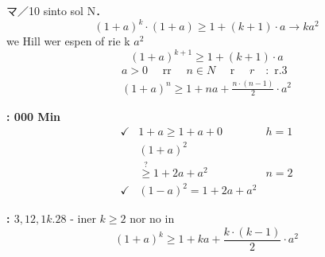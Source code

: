\documentclass[12pt]{article}
\begin{document}
マ／10 sinto sol N．
\[
(1+a)^{k} \cdot(1+a) \geq 1+(k+1) \cdot a \rightarrow k a^{2}
\]
we Hill wer espen of rie k \(a^{2}\)
\[
(1+a)^{k+1} \geq 1+(k+1) \cdot a
\]
\[
\begin{gathered}
a>0 \quad \text { rr } \quad n \in N \quad \text { r } \quad r \quad: \text { r.3 } \\
(1+a)^{n} \geq 1+n a+\frac{n \cdot(n-1)}{2} \cdot a^{2}
\end{gathered}
\]

\textbf{: 000 Min}
\[
\begin{array}{lll}
\checkmark & 1+a \geq 1+a+0 & h=1 \\
& (1+a)^{2} \\
& \stackrel{?}{\geq} 1+2 a+a^{2} & n=2 \\
\checkmark & (1-a)^{2}=1+2 a+a^{2} &
\end{array}
\]

\textbf{: \(3,12,1 k .28\)}
- iner \(k \geq 2\) nor no in
\[
(1+a)^{k} \geq 1+k a+\frac{k \cdot(k-1)}{2} \cdot a^{2}
\]
\end{document}
